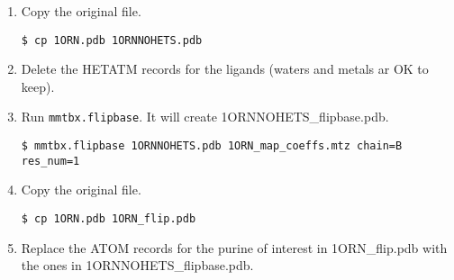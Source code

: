 \documentclass[12pt]{article}
\newcommand{\cmdline}[1]{\vspace{5mm} \noindent
\texttt{\$ #1}
\vspace{5mm}

}
\begin{document}
\begin{enumerate}
  \item Copy the original file.
  
  \vspace{-6mm}
  \cmdline{cp 1ORN.pdb 1ORNNOHETS.pdb}
  \vspace{-6mm}
  \item Delete the HETATM records for the ligands (waters and metals ar OK to keep).
  \item Run \texttt{mmtbx.flipbase}. It will create 1ORNNOHETS\_flipbase.pdb.
  
  \vspace{-6mm}
  \cmdline{mmtbx.flipbase 1ORNNOHETS.pdb 1ORN\_map\_coeffs.mtz chain=B res\_num=1}
  \vspace{-6mm}
  \item Copy the original file.
  
  \vspace{-6mm}
  \cmdline{cp 1ORN.pdb 1ORN\_flip.pdb}
  \vspace{-6mm}
  \item Replace the ATOM records for the purine of interest in 1ORN\_flip.pdb with the ones in 1ORNNOHETS\_flipbase.pdb.
\end{enumerate}
\end{document}
